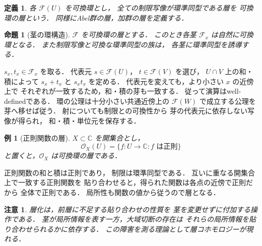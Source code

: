 \documentclass[a5paper,10pt,onecolumn]{jsarticle}
\makeatletter
\theoremstyle{mathnotetheorem}
\newtheorem{definition}[theorem]{定義}
\newtheorem{proposition}[theorem]{命題}
\newtheorem{example}[theorem]{例}
\newtheorem{remark}[theorem]{注意}
\renewcommand{\proofname}{証明}
\renewenvironment{proof}[1][\proofname]{%
  \par\pushQED{\qed}\normalfont\topsep4\p@\@plus2\p@\relax
  \trivlist\item[\hskip\labelsep\bfseries #1]\ignorespaces
}{\popQED\endtrivlist\@endpefalse}
\makeatother
\begin{document}
\begin{definition}
各 $\mathcal F(U)$ を可換環とし，
全ての制限写像が環準同型である層を
\emph{可換環の層}という．
同様にAbel群の層，加群の層を定義する．
\end{definition}

\begin{proposition}[茎の環構造]\label{prop:ring-stalk}
$\mathcal F$ を可換環の層とする．
このとき各茎 $\mathcal F_x$ は自然に可換環となる．
また制限写像と可換な環準同型の族は，
各茎に環準同型を誘導する．
\end{proposition}
\begin{proof}
$s_x,t_x\in\mathcal F_x$ を取る．
代表元 $s\in\mathcal F(U)$，
$t\in\mathcal F(V)$ を選び，
$U\cap V$ 上の和・積によって
$s_x+t_x$ と $s_xt_x$ を定める．
代表元を変えても，より小さい $x$ の近傍上で
それぞれが一致するため，和・積の芽も一致する．
従って演算はwell-definedである．
環の公理は十分小さい共通近傍上の
$\mathcal F(W)$ で成立する公理を芽へ移せば従う．
射についても制限との可換性から
芽の代表元に依存しない写像が得られ，
和・積・単位元を保存する．
\end{proof}

\begin{example}[正則関数の層]
$X\subset\mathbb C$ を開集合とし，
\[
 \mathcal O_X(U)=\{f:U\to\mathbb C:f\text{ は正則}\}
\]
と置くと，$\mathcal O_X$ は可換環の層である．
\end{example}
\begin{proof}
正則関数の和と積は正則であり，
制限は環準同型である．
互いに重なる開集合上で一致する正則関数を
貼り合わせると，得られた関数は各点の近傍で正則だから
全体で正則である．
局所性も関数の値から従うので層となる．
\end{proof}

\begin{remark}
層化は，前層に不足する貼り合わせの性質を
茎を変更せずに付加する操作である．
茎が局所情報を表す一方，大域切断の存在は
それらの局所情報を貼り合わせられるかに依存する．
この障害を測る理論として層コホモロジーが現れる．
\end{remark}
\end{document}
